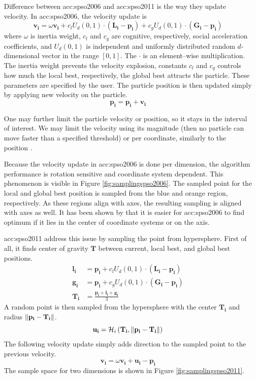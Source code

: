 Difference between \acrshort{acc:spso2006} and \acrshort{acc:spso2011} is the way they update velocity. In \acrshort{acc:spso2006}, the velocity update is
$$
\mathbf{v_i} = \omega\mathbf{v_i} 
+ c_l U_d\left( 0,1 \right) \cdot \left( \mathbf{L_i} - \mathbf{p_i} \right)
+ c_g U_d\left( 0,1 \right) \cdot \left( \mathbf{G_i} - \mathbf{p_i} \right)
$$ 
where $\omega$ is inertia weight, $c_l$ and $c_g$ are cognitive, respectively, social acceleration coefficients, and $U_d(0,1)$ is independent and uniformly distributed random $d$-dimensional vector in the range $\left[ 0,1 \right]$. The $\cdot$ is an element--wise multiplication. The inertia weight prevents the velocity explosion, constants $c_l$ and $c_g$ controls how much the local best, respectively, the global best attracts the particle. These parameters are specified by the user. The particle position is then updated simply by applying new velocity on the particle.
$$
\mathbf{p_i} = \mathbf{p_i} + \mathbf{v_i}
$$

One may further limit the particle velocity or position, so it stays in the interval of interest. We may limit the velocity using its magnitude (then no particle can move faster than a specified threshold) or per coordinate, similarly to the position \citep{PSOvelocitylimit}.

Because the velocity update in \acrshort{acc:spso2006} is done per dimension, the algorithm performance is rotation sensitive and coordinate system dependent. This phenomenon is visible in Figure \ref{fig:samplingspso2006}. The sampled point for the local and global best position is sampled from the blue and orange region, respectively. As these regions align with axes, the resulting sampling is aligned with axes as well. It has been shown by \citet{psobiasinzero} that it is easier for \acrshort{acc:spso2006} to find optimum if it lies in the center of coordinate systems or on the axis.

\acrshort{acc:spso2011} address this issue by sampling the point from hypersphere. First of all, it finds center of gravity $\mathbf{T}$ between current, local best, and global best positions.
\begin{align*}
    \mathbf{l_i} &= \mathbf{p_i} + c_l U_d\left( 0,1 \right) \cdot \left( \mathbf{L_i} - \mathbf{p_i} \right) \\
    \mathbf{g_i} &= \mathbf{p_i} + c_g U_d\left( 0,1 \right) \cdot \left( \mathbf{G_i} - \mathbf{p_i} \right) \\
    \mathbf{T_i} &= \frac{\mathbf{p_i}+\mathbf{l_i}+\mathbf{g_i}}{3}
\end{align*}
A random point is then sampled from the hypersphere with the center $\mathbf{T_i}$ and radius $\left\lVert\mathbf{p_i} - \mathbf{T_i}\right\rVert$.
$$
\mathbf{u_i} = \mathcal{H}_i\left(\mathbf{T_i}, \left\lVert\mathbf{p_i} - \mathbf{T_i}\right\rVert\right)
$$
The following velocity update simply adds direction to the sampled point to the previous velocity.
$$
\mathbf{v_i} = \omega\mathbf{v_i}+\mathbf{u_i}-\mathbf{p_i}
$$
The sample space for two dimensions is shown in Figure \ref{fig:samplingspso2011}.
